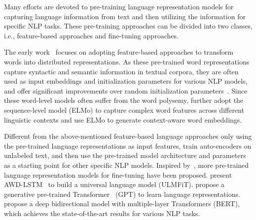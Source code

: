\documentclass[11pt,a4paper]{article}
\begin{document}
Many efforts are devoted to pre-training language representation models for capturing language information from text and then utilizing the information for specific NLP tasks. These pre-training approaches can be divided into two classes, i.e., feature-based approaches and fine-tuning approaches.

The early work~\cite{collobert2008unified,mikolov2013distributed,pennington2014glove} focuses on adopting feature-based approaches to transform words into distributed representations. As these pre-trained word representations capture syntactic and semantic information in textual corpora, they are often used as input embeddings and initialization parameters for various NLP models, and offer significant improvements over random initialization parameters~\cite{turian2010word}. Since these word-level models often suffer from the word polysemy,  further adopt the sequence-level model (ELMo) to capture complex word features across different linguistic contexts and use ELMo to generate context-aware word embeddings.

Different from the above-mentioned feature-based language approaches only using the pre-trained language representations as input features,  train auto-encoders on unlabeled text, and then use the pre-trained model architecture and parameters as a starting point for other specific NLP models. Inspired by~, more pre-trained language representation models for fine-tuning have been proposed.  present AWD-LSTM~\cite{merity2017regularizing} to build a universal language model (ULMFiT).   propose a generative pre-trained Transformer~\cite{vaswani2017attention} (GPT) to learn language representations.  propose a deep bidirectional model with multiple-layer Transformers (BERT), which achieves the state-of-the-art results for various NLP tasks.
\end{document}
